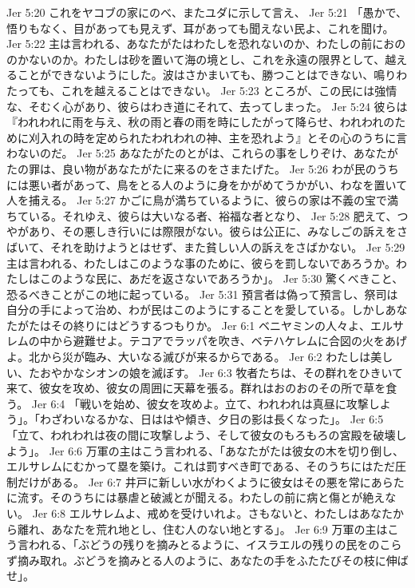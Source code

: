 Jer 5:20  これをヤコブの家にのべ、またユダに示して言え、
Jer 5:21  「愚かで、悟りもなく、目があっても見えず、耳があっても聞えない民よ、これを聞け。
Jer 5:22  主は言われる、あなたがたはわたしを恐れないのか、わたしの前におののかないのか。わたしは砂を置いて海の境とし、これを永遠の限界として、越えることができないようにした。波はさかまいても、勝つことはできない、鳴りわたっても、これを越えることはできない。
Jer 5:23  ところが、この民には強情な、そむく心があり、彼らはわき道にそれて、去ってしまった。
Jer 5:24  彼らは『われわれに雨を与え、秋の雨と春の雨を時にしたがって降らせ、われわれのために刈入れの時を定められたわれわれの神、主を恐れよう』とその心のうちに言わないのだ。
Jer 5:25  あなたがたのとがは、これらの事をしりぞけ、あなたがたの罪は、良い物があなたがたに来るのをさまたげた。
Jer 5:26  わが民のうちには悪い者があって、鳥をとる人のように身をかがめてうかがい、わなを置いて人を捕える。
Jer 5:27  かごに鳥が満ちているように、彼らの家は不義の宝で満ちている。それゆえ、彼らは大いなる者、裕福な者となり、
Jer 5:28  肥えて、つやがあり、その悪しき行いには際限がない。彼らは公正に、みなしごの訴えをさばいて、それを助けようとはせず、また貧しい人の訴えをさばかない。
Jer 5:29  主は言われる、わたしはこのような事のために、彼らを罰しないであろうか。わたしはこのような民に、あだを返さないであろうか」。
Jer 5:30  驚くべきこと、恐るべきことがこの地に起っている。
Jer 5:31  預言者は偽って預言し、祭司は自分の手によって治め、わが民はこのようにすることを愛している。しかしあなたがたはその終りにはどうするつもりか。
Jer 6:1  ベニヤミンの人々よ、エルサレムの中から避難せよ。テコアでラッパを吹き、ベテハケレムに合図の火をあげよ。北から災が臨み、大いなる滅びが来るからである。
Jer 6:2  わたしは美しい、たおやかなシオンの娘を滅ぼす。
Jer 6:3  牧者たちは、その群れをひきいて来て、彼女を攻め、彼女の周囲に天幕を張る。群れはおのおのその所で草を食う。
Jer 6:4  「戦いを始め、彼女を攻めよ。立て、われわれは真昼に攻撃しよう」。「わざわいなるかな、日ははや傾き、夕日の影は長くなった」。
Jer 6:5  「立て、われわれは夜の間に攻撃しよう、そして彼女のもろもろの宮殿を破壊しよう」。
Jer 6:6  万軍の主はこう言われる、「あなたがたは彼女の木を切り倒し、エルサレムにむかって塁を築け。これは罰すべき町である、そのうちにはただ圧制だけがある。
Jer 6:7  井戸に新しい水がわくように彼女はその悪を常にあらたに流す。そのうちには暴虐と破滅とが聞える。わたしの前に病と傷とが絶えない。
Jer 6:8  エルサレムよ、戒めを受けいれよ。さもないと、わたしはあなたから離れ、あなたを荒れ地とし、住む人のない地とする」。
Jer 6:9  万軍の主はこう言われる、「ぶどうの残りを摘みとるように、イスラエルの残りの民をのこらず摘み取れ。ぶどうを摘みとる人のように、あなたの手をふたたびその枝に伸ばせ」。
